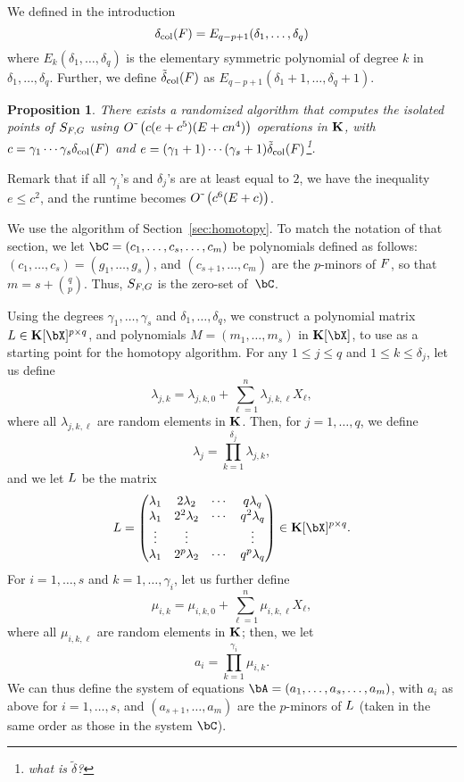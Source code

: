 \documentclass[12pt]{article}
\newtheorem{proposition}[definition]{Proposition}
\begin{document}
We defined in the introduction 
$$\delta_{\rm col}({F}) = E_{q-p+1}(\delta_1, \ldots, \delta_q)$$
where $E_k(\delta_1,\dots,\delta_q)$ is the elementary symmetric
polynomial of degree $k$ in $\delta_1, \ldots, \delta_q$. Further, we
define $\tilde\delta_{\rm col}({F})$ as
$E_{q-p+1}(\delta_1+1, \ldots, \delta_q+1)$.
\begin{proposition}
  There exists a randomized algorithm that computes the isolated
  points of $S_{{F},G}$ using
  ${O}{\,\tilde{ }\,}\left (c(e+c^5 )(E + cn^4)\right)$ operations in $\mathbf{K}$, with
  $c=\gamma_1\cdots\gamma_s \delta_{\rm col}({F})$ and
  $e=(\gamma_1+1)\cdots(\gamma_s+1) \tilde\delta_{\rm
    col}({F})$\footnote{what is $\tilde\delta$?}.
\end{proposition}
Remark that if all $\gamma_i$'s and $\delta_j$'s are at least equal to
$2$, we have the inequality $e \le c^2$, and the runtime becomes
${O}{\,\tilde{ }\,}\left (c^6 (E + c)\right)$.

\medskip

We use the algorithm of Section~\ref{sec:homotopy}. To match the
notation of that section, we let $\bC=(c_1,\dots,c_{s},\dots,c_m)$ be
polynomials defined as follows: $(c_1,\dots,c_{s})=(g_1,\dots,g_s)$,
and $(c_{s+1},\dots,c_{m})$ are the $p$-minors of ${F}$, so that 
$m=s+{q \choose p}$. Thus, $S_{{F},G}$ is the zero-set of~$\bC$.

Using the degrees $\gamma_1,\dots,\gamma_s$ and  $\delta_1,\dots,\delta_q$, we construct a polynomial matrix $\mL \in
\KK[\bX]^{p \times q}$, and polynomials $M=(m_1,\dots,m_s)$ in
$\KK[\bX]$, to use as a starting point for the homotopy
algorithm. For any $1 \leq j \leq q$ and $1 \leq k \leq \delta_j$, let us
define $$\lambda_{j,k} = \lambda_{j,k,0} + \sum_{\ell = 1}^{n}\lambda_{j,k,\ell}X_\ell,$$ 
where all $\lambda_{j,k,\ell}$ are random elements in
$\mathbf{K}$. Then, for $j=1,\dots,q$, we define
$$\lambda_j = \prod_{k=1}^{\delta_j}\lambda_{j,k},$$
and we let  ${L}$ be the matrix
\begin{align}\label{eqdef:col}
\mL = 
\left( \begin{matrix}
\lambda_1 & 2\lambda_2 & \cdots & q\lambda_{q}\\
\lambda_1 & 2^2\lambda_2 & \cdots & q^2\lambda_q\\
\vdots & \vdots &  & \vdots \\
\lambda_1 & 2^p\lambda_2 & \cdots & q^p\lambda_q
\end{matrix} \right) \in \KK[\bX]^{p\times q}.
\end{align}
For $i=1,\dots,s$ and $k=1,\dots,\gamma_i$, let us further define
$$\mu_{i,k} =  \mu_{i,k,0} + \sum_{\ell = 1}^{n}\mu_{i,k,\ell}X_\ell,$$ where
all $\mu_{i,k,\ell}$ are random elements in $\mathbf{K}$; then, we let
$$a_i=\prod_{k=1}^{\gamma_i} \mu_{i,k}.$$ We can thus define the
system of equations $\bA=(a_1,\dots,a_s,\dots,a_m)$, with $a_i$ as
above for $i=1,\dots,s$, and $(a_{s+1},\dots,a_{m})$ are the
$p$-minors of ${L}$ (taken in the same order as those in the system
$\bC$).
\end{document}
